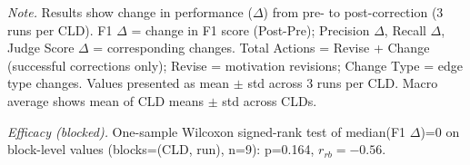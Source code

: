 \begin{table}[H]
\centering
\begin{minipage}{\linewidth}
\centering
\caption{Corrector Performance on Ground Truth Data Using Correctness-Based Validation (Baseline Prompt)}
\label{tab:rq1b_groundtruth_correctness}
\begin{threeparttable}
\end{threeparttable}
\vspace{0.5em}
\footnotesize
\textit{Note.} Results show change in performance ($\Delta$) from pre- to post-correction (3 runs per CLD).
F1 $\Delta$ = change in F1 score (Post-Pre); Precision $\Delta$, Recall $\Delta$, Judge Score $\Delta$ = corresponding changes.
Total Actions = Revise + Change (successful corrections only); Revise = motivation revisions; Change Type = edge type changes.
Values presented as mean $\pm$ std across 3 runs per CLD. Macro average shows mean of CLD means $\pm$ std across CLDs.\par
\textit{Efficacy (blocked).} One-sample Wilcoxon signed-rank test of median(F1 $\Delta$)=0 on block-level values (blocks=(CLD, run), n=9): p=0.164, $r_{rb}=-0.56$.

\end{minipage}
\end{table}
